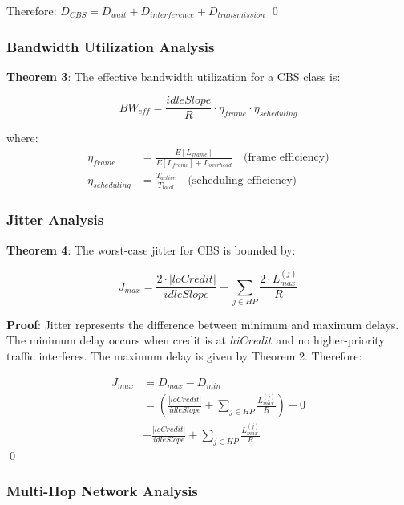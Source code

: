 \documentclass[10pt, journal, compsoc]{IEEEtran}
\begin{document}
Therefore: $D_{CBS} = D_{wait} + D_{interference} + D_{transmission}$ \qed

\subsubsection{Bandwidth Utilization Analysis}

\textbf{Theorem 3}: The effective bandwidth utilization for a CBS class is:

\begin{equation}
BW_{eff} = \frac{idleSlope}{R} \cdot \eta_{frame} \cdot \eta_{scheduling}
\end{equation}

where:
\begin{align}
\eta_{frame} &= \frac{E[L_{frame}]}{E[L_{frame}] + L_{overhead}} \quad \text{(frame efficiency)} \\
\eta_{scheduling} &= \frac{T_{active}}{T_{total}} \quad \text{(scheduling efficiency)}
\end{align}

\subsubsection{Jitter Analysis}

\textbf{Theorem 4}: The worst-case jitter for CBS is bounded by:

\begin{equation}
J_{max} = \frac{2 \cdot |loCredit|}{idleSlope} + \sum_{j \in HP} \frac{2 \cdot L_{max}^{(j)}}{R}
\end{equation}

\textbf{Proof}: Jitter represents the difference between minimum and maximum delays. The minimum delay occurs when credit is at $hiCredit$ and no higher-priority traffic interferes. The maximum delay is given by Theorem 2. Therefore:

\begin{align}
J_{max} &= D_{max} - D_{min} \\
&= \left(\frac{|loCredit|}{idleSlope} + \sum_{j \in HP} \frac{L_{max}^{(j)}}{R}\right) - 0 \\
&+ \frac{|loCredit|}{idleSlope} + \sum_{j \in HP} \frac{L_{max}^{(j)}}{R}
\end{align} \qed

\subsubsection{Multi-Hop Network Analysis}
\end{document}
